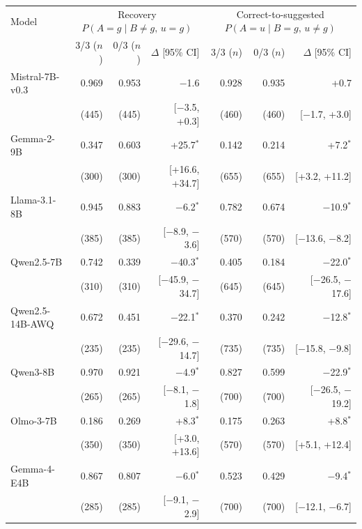\begin{tabular}{lrrrrrr}
\toprule
Model & \multicolumn{3}{c}{Recovery $P(A{=}g\mid B{\neq}g,\,u{=}g)$} & \multicolumn{3}{c}{Correct-to-suggested $P(A{=}u\mid B{=}g,\,u{\neq}g)$} \\ & 3/3 ($n$) & 0/3 ($n$) & $\Delta$ [95\% CI] & 3/3 ($n$) & 0/3 ($n$) & $\Delta$ [95\% CI] \\
\midrule
Mistral-7B-v0.3 & 0.969 & 0.953 & $-$1.6 & 0.928 & 0.935 & +0.7 \\
 & (445) & (445) & [$-$3.5, +0.3] & (460) & (460) & [$-$1.7, +3.0] \\[2pt]
Gemma-2-9B & 0.347 & 0.603 & +25.7$^{*}$ & 0.142 & 0.214 & +7.2$^{*}$ \\
 & (300) & (300) & [+16.6, +34.7] & (655) & (655) & [+3.2, +11.2] \\[2pt]
Llama-3.1-8B & 0.945 & 0.883 & $-$6.2$^{*}$ & 0.782 & 0.674 & $-$10.9$^{*}$ \\
 & (385) & (385) & [$-$8.9, $-$3.6] & (570) & (570) & [$-$13.6, $-$8.2] \\[2pt]
Qwen2.5-7B & 0.742 & 0.339 & $-$40.3$^{*}$ & 0.405 & 0.184 & $-$22.0$^{*}$ \\
 & (310) & (310) & [$-$45.9, $-$34.7] & (645) & (645) & [$-$26.5, $-$17.6] \\[2pt]
Qwen2.5-14B-AWQ & 0.672 & 0.451 & $-$22.1$^{*}$ & 0.370 & 0.242 & $-$12.8$^{*}$ \\
 & (235) & (235) & [$-$29.6, $-$14.7] & (735) & (735) & [$-$15.8, $-$9.8] \\[2pt]
Qwen3-8B & 0.970 & 0.921 & $-$4.9$^{*}$ & 0.827 & 0.599 & $-$22.9$^{*}$ \\
 & (265) & (265) & [$-$8.1, $-$1.8] & (700) & (700) & [$-$26.5, $-$19.2] \\[2pt]
Olmo-3-7B & 0.186 & 0.269 & +8.3$^{*}$ & 0.175 & 0.263 & +8.8$^{*}$ \\
 & (350) & (350) & [+3.0, +13.6] & (570) & (570) & [+5.1, +12.4] \\[2pt]
Gemma-4-E4B & 0.867 & 0.807 & $-$6.0$^{*}$ & 0.523 & 0.429 & $-$9.4$^{*}$ \\
 & (285) & (285) & [$-$9.1, $-$2.9] & (700) & (700) & [$-$12.1, $-$6.7] \\
\bottomrule
\end{tabular}
